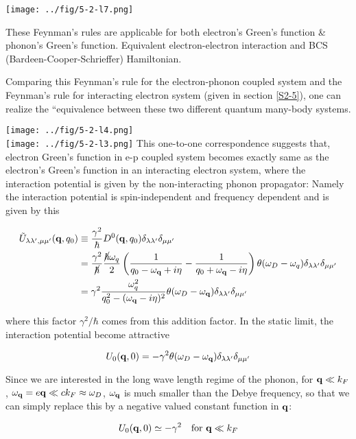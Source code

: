 \texttt{[image: ../fig/5-2-l7.png]}

These Feynman's rules are applicable for both electron's Green's function \& phonon's Green's function. Equivalent electron-electron interaction and BCS (Bardeen-Cooper-Schrieffer) Hamiltonian.

Comparing this Feynman's rule for the electron-phonon coupled system and the Feynman's rule for interacting electron system (given in section \ref{S2-5}), one can realize the ``equivalence between these two different quantum many-body systems.

\newpage
\texttt{[image: ../fig/5-2-l4.png]}\\
\texttt{[image: ../fig/5-2-l3.png]}
\newpage
This one-to-one correspondence suggests that, electron Green's function in e-p coupled system becomes exactly same as the electron's Green's function in an interacting electron system, where the interaction potential is given by the non-interacting phonon propagator: Namely the interaction potential is spin-independent and frequency dependent and is given by this

\[\begin{split}
\tilde{U}_{\lambda\lambda',\mu\mu'}({\bf q},q_0)&\equiv\frac{\gamma^2}{\hbar}D^0({\bf q},q_0)\delta_{\lambda\lambda'}\delta_{\mu\mu'}\\
&=\frac{\gamma^2}{\cancel\hbar}\frac{\cancel{\hbar}\omega_q}{2}\left(\frac{1}{q_0-\omega_{\bf q}+i\eta} - \frac{1}{q_0+\omega_{\bf q}-i\eta}\right)\theta(\omega_D-\omega_q)\delta_{\lambda\lambda'}\delta_{\mu\mu'}\\
&=\gamma^2\frac{\omega_q^2}{q_0^2-(\omega_{\bf q}-i\eta)^2}\theta(\omega_D-\omega_{\bf q})\delta_{\lambda\lambda'}\delta_{\mu\mu'}
\end{split} \]

where this factor $\gamma^2/\hbar$ comes from this addition factor. In the static limit, the interaction potential become attractive

\[ U_0({\bf q},0) = -\gamma^2\theta(\omega_D-\omega_{\bf q})\delta_{\lambda\lambda'}\delta_{\mu\mu'}\]

Since we are interested in the long wave length regime of the phonon, for ${\bf q}\ll k_F$, $\omega_{\bf q} = e{\bf q} \ll ck_F\approx\omega_D$, $\omega_{\bf q}$ is much smaller than the Debye frequency, so that we can simply replace this by a negative valued constant function in $\bf q$:

\[U_0({\bf q},0)\simeq -\gamma^2\quad\text{for }{\bf q}\ll k_F \]

